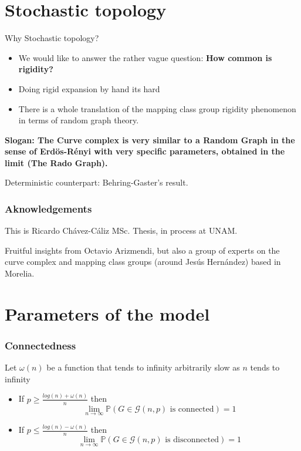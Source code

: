 \documentclass[handout]{beamer}
\theoremstyle{plain}
\renewcommand{\P}{\mathbb{P}}
\newcommand{\G}{\mathcal{G}}
\begin{document}
\section{Stochastic topology}
\begin{frame}{Why Stochastic topology?}
\begin{itemize}
    \item We would like to answer the rather vague question: \textbf{How common is rigidity?}
    \item Doing rigid expansion by hand its hard
    \item There is a  whole translation of the mapping class group rigidity phenomenon in terms of random graph theory.
\end{itemize}    
\end{frame}


\begin{frame}

\textbf{Slogan: The  Curve  complex  is   very  similar  to  a Random Graph  in the  sense  of  Erd\"os-R\'enyi  with  very  specific  parameters,  obtained  in the  limit (The  Rado Graph). \pause }

Deterministic counterpart: Behring-Gaster's result. 

\end{frame}

\begin{frame}\frametitle{Aknowledgements}

\begin{center}
This  is  Ricardo Ch\'avez-C\'aliz  MSc. Thesis, in process at  UNAM. 
\end{center}

Fruitful  insights  from  Octavio Arizmendi, \pause but  also a  group  of  experts on the  curve  complex  and  mapping class  groups (around Jes\'us Hern\'andez) based  in Morelia.

\end{frame}

\section{Parameters of the model}
\begin{frame}
\frametitle{Connectedness}

\begin{theorem}
Let $\omega(n)$ be a function that tends to infinity arbitrarily slow as $n$ tends to infinity
\begin{itemize}
\item If $p\geq \frac{log(n)+ \omega(n)}{n}$ then 
$$\lim_{n \to \infty} \P(G \in \G(n,p) \text{ is connected}) = 1$$
\item If $p\leq \frac{log(n)- \omega(n)}{n}$ then
$$\lim_{n \to \infty} \P(G \in \G(n,p) \text{ is disconnected}) = 1$$
\end{itemize}
\end{theorem}

\end{frame}
\end{document}
